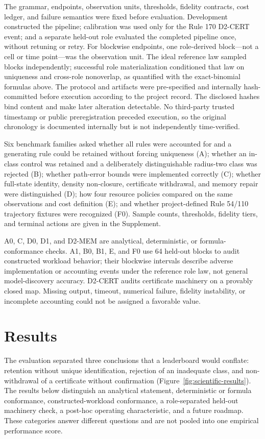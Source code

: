 \documentclass[10pt]{article}
\theoremstyle{definition}
\begin{document}
The grammar, endpoints, observation units, thresholds, fidelity contracts, cost ledger, and
failure semantics were fixed before evaluation. Development constructed the pipeline;
calibration was used only for the Rule 170 D2-CERT event; and a separate held-out role evaluated
the completed pipeline once, without retuning or retry. For blockwise endpoints, one role-derived
block---not a cell or time point---was the observation unit. The ideal reference law sampled
blocks independently; successful role materialization conditioned that law on uniqueness and
cross-role nonoverlap, as quantified with the exact-binomial formulas above. The protocol and
artifacts were pre-specified and internally hash-committed before execution according to the
project record. The disclosed hashes bind content and make later alteration detectable. No
third-party trusted timestamp or public preregistration preceded execution, so the original
chronology is documented internally but is not independently time-verified.

Six benchmark families asked whether all rules were accounted for and a generating rule could be
retained without forcing uniqueness (A); whether an in-class control was retained and a
deliberately distinguishable radius-two class was rejected (B); whether path-error bounds were
implemented correctly (C); whether full-state identity, density non-closure, certificate
withdrawal, and memory repair were distinguished (D); how four resource policies compared on the
same observations and cost definition (E); and whether project-defined Rule 54/110 trajectory
fixtures were recognized (F0). Sample counts, thresholds, fidelity tiers, and terminal actions are
given in the Supplement.

A0, C, D0, D1, and D2-MEM are analytical, deterministic, or formula-conformance checks. A1, B0,
B1, E, and F0 use 64 held-out blocks to audit constructed workload behavior; their blockwise
intervals describe adverse implementation or accounting events under the reference role law, not
general model-discovery accuracy. D2-CERT audits certificate machinery on a provably closed map.
Missing output, timeout, numerical failure, fidelity instability, or incomplete accounting could
not be assigned a favorable value.

\section{Results}
\label{sec:results}

The evaluation separated three conclusions that a leaderboard would conflate: retention without
unique identification, rejection of an inadequate class, and non-withdrawal of a certificate
without confirmation (Figure~\ref{fig:scientific-results}). The results below distinguish an
analytical statement, deterministic or formula conformance, constructed-workload conformance, a
role-separated held-out machinery check, a post-hoc operating characteristic, and a future
roadmap. These categories answer different questions and are not pooled into one empirical
performance score.
\end{document}
